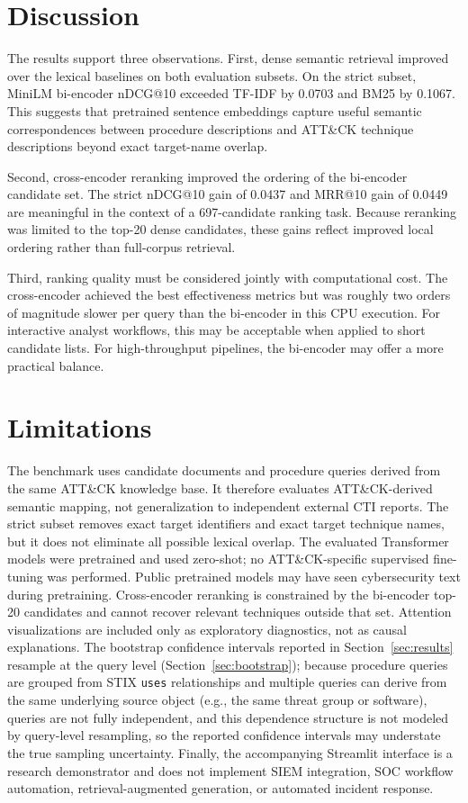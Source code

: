 \documentclass[conference]{IEEEtran}
\begin{document}
\section{Discussion}
The results support three observations. First, dense semantic retrieval improved over the lexical baselines on both evaluation subsets. On the strict subset, MiniLM bi-encoder nDCG@10 exceeded TF-IDF by 0.0703 and BM25 by 0.1067. This suggests that pretrained sentence embeddings capture useful semantic correspondences between procedure descriptions and ATT\&CK technique descriptions beyond exact target-name overlap.

Second, cross-encoder reranking improved the ordering of the bi-encoder candidate set. The strict nDCG@10 gain of 0.0437 and MRR@10 gain of 0.0449 are meaningful in the context of a 697-candidate ranking task. Because reranking was limited to the top-20 dense candidates, these gains reflect improved local ordering rather than full-corpus retrieval.

Third, ranking quality must be considered jointly with computational cost. The cross-encoder achieved the best effectiveness metrics but was roughly two orders of magnitude slower per query than the bi-encoder in this CPU execution. For interactive analyst workflows, this may be acceptable when applied to short candidate lists. For high-throughput pipelines, the bi-encoder may offer a more practical balance.

\section{Limitations}
\label{sec:limitations}
The benchmark uses candidate documents and procedure queries derived from the same ATT\&CK knowledge base. It therefore evaluates ATT\&CK-derived semantic mapping, not generalization to independent external CTI reports. The strict subset removes exact target identifiers and exact target technique names, but it does not eliminate all possible lexical overlap. The evaluated Transformer models were pretrained and used zero-shot; no ATT\&CK-specific supervised fine-tuning was performed. Public pretrained models may have seen cybersecurity text during pretraining. Cross-encoder reranking is constrained by the bi-encoder top-20 candidates and cannot recover relevant techniques outside that set. Attention visualizations are included only as exploratory diagnostics, not as causal explanations. The bootstrap confidence intervals reported in Section~\ref{sec:results} resample at the query level (Section~\ref{sec:bootstrap}); because procedure queries are grouped from STIX \texttt{uses} relationships and multiple queries can derive from the same underlying source object (e.g., the same threat group or software), queries are not fully independent, and this dependence structure is not modeled by query-level resampling, so the reported confidence intervals may understate the true sampling uncertainty. Finally, the accompanying Streamlit interface is a research demonstrator and does not implement SIEM integration, SOC workflow automation, retrieval-augmented generation, or automated incident response.
\end{document}
